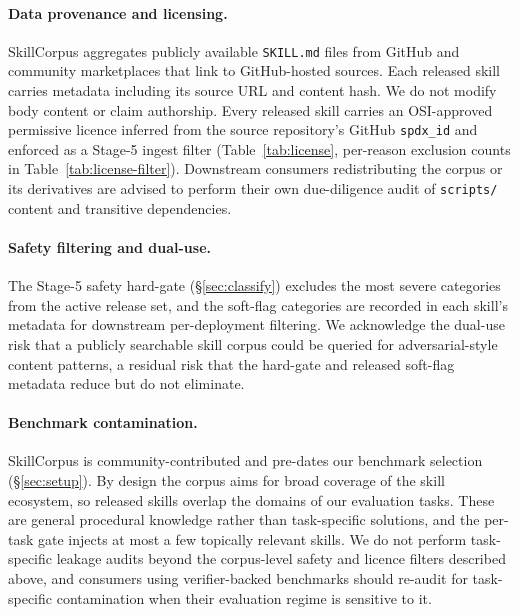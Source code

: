 
\ifarxiv
\paragraph{Data provenance and licensing.}
SkillCorpus aggregates publicly available \texttt{SKILL.md}
files from GitHub and community marketplaces that link to
GitHub-hosted sources.  Each released skill carries metadata
including its source URL and content hash.  We do not modify
body content or claim authorship.  Every released skill carries
an OSI-approved permissive licence inferred from the source
repository's GitHub \texttt{spdx\_id} and enforced as a Stage-5
ingest filter (Table~\ref{tab:license}, per-reason exclusion
counts in Table~\ref{tab:license-filter}).  Downstream consumers
redistributing the corpus or its derivatives are advised to
perform their own due-diligence audit of \texttt{scripts/}
content and transitive dependencies.

\paragraph{Safety filtering and dual-use.}
The Stage-5 safety hard-gate (\S\ref{sec:classify}) excludes the
most severe categories from the active release set, and the
soft-flag categories are recorded in each skill's metadata for
downstream per-deployment filtering.  We acknowledge the dual-use
risk that a publicly searchable skill corpus could be queried for
adversarial-style content patterns, a residual risk that the
hard-gate and released soft-flag metadata reduce but do not
eliminate.

\paragraph{Benchmark contamination.}
SkillCorpus is community-contributed and pre-dates our benchmark
selection (\S\ref{sec:setup}).  By design the corpus aims for
broad coverage of the skill ecosystem, so released skills overlap
the domains of our evaluation tasks.  These are general procedural
knowledge rather than task-specific solutions, and the per-task
gate injects at most a few topically relevant skills.  We do not
perform task-specific leakage audits beyond the corpus-level
safety and licence filters described above, and consumers using
verifier-backed benchmarks should re-audit for task-specific
contamination when their evaluation regime is sensitive to it.

